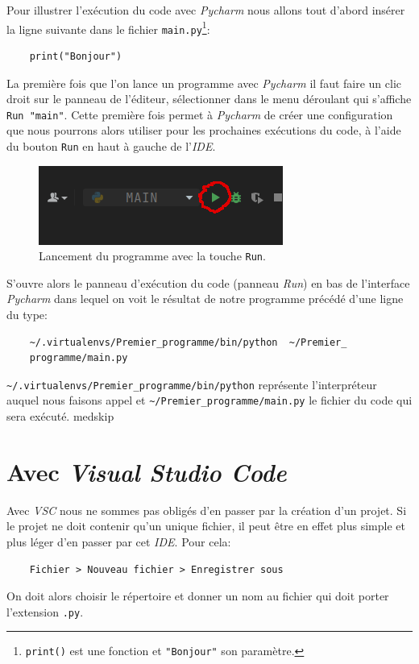 \documentclass[a4paper,11pt]{book}
\begin{document}
Pour illustrer l'exécution du code avec \textit{Pycharm} nous allons tout d'abord insérer la ligne suivante dans le fichier \texttt{main.py}\footnote{\texttt{print()} est une fonction et \texttt{"Bonjour"} son paramètre.}:
\begin{verbatim}
    print("Bonjour")
\end{verbatim}
\medskip

La première fois que l'on lance un programme avec \textit{Pycharm} il faut faire un clic droit sur le panneau de l'éditeur, sélectionner dans le menu déroulant qui s'affiche \texttt{Run "main"}. Cette première fois permet à \textit{Pycharm} de créer une configuration que nous pourrons alors utiliser pour les prochaines exécutions du code, à l'aide du bouton \texttt{Run} en haut à gauche de l'\textit{IDE}.
\begin{figure}[h]
\begin{center}
\includegraphics[scale=0.5]{IMG/Pycharm-04.png}
\caption{Lancement du programme avec la touche \texttt{Run}.}
\end{center}
\end{figure}
\medskip

S'ouvre alors le panneau d'exécution du code (panneau \textit{Run}) en bas de l'interface \textit{Pycharm} dans lequel on voit le résultat de notre programme précédé d'une ligne du type:
\begin{verbatim}
    ~/.virtualenvs/Premier_programme/bin/python  ~/Premier_
    programme/main.py
\end{verbatim}
\verb|~/.virtualenvs/Premier_programme/bin/python| représente l'interpréteur auquel nous faisons appel et \verb|~/Premier_programme/main.py| le fichier du code qui sera exécuté.
medskip

\section{Avec \textit{Visual Studio Code}}
Avec \textit{VSC} nous ne sommes pas obligés d'en passer par la création d'un projet. Si le projet ne doit contenir qu'un unique fichier, il peut être en effet plus simple et plus léger d'en passer par cet \textit{IDE}. Pour cela:
\begin{verbatim}
    Fichier > Nouveau fichier > Enregistrer sous
\end{verbatim}
On doit alors choisir le répertoire et donner un nom au fichier qui doit porter l'extension \texttt{.py}.
\medskip
\end{document}
